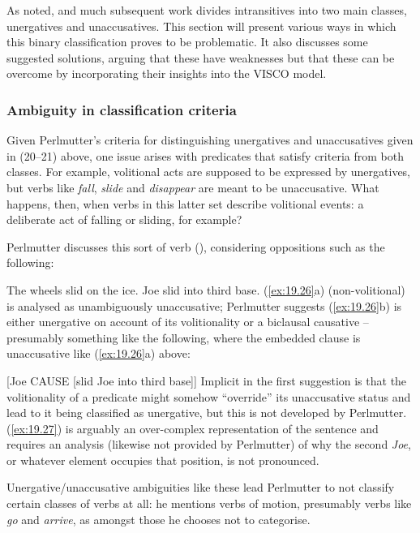 \documentclass[output=paper]{langsci/langscibook}
\begin{document}
As noted, \citet{Perlmutter1978} and much subsequent work divides intransitives
into two main classes, unergatives and unaccusatives. This section will present
various ways in which this binary classification proves to be problematic. It
also discusses some suggested solutions, arguing that these have weaknesses but
that these can be overcome by incorporating their insights into the VISCO
model.

\subsubsection{Ambiguity in classification criteria}

Given Perlmutter’s criteria for distinguishing unergatives and unaccusatives
given in (20–21) above, one issue arises with predicates that satisfy criteria
from both classes. For example, volitional acts are supposed to be expressed by
unergatives, but verbs like \emph{fall}, \emph{slide} and
\emph{disappear} are meant to be unaccusative. What happens, then, when verbs
in this latter set describe volitional events: a deliberate act of falling or
sliding, for example?

Perlmutter discusses this sort of verb (\citeyear[163--164]{Perlmutter1978}),
considering oppositions such as the following:

\ea\label{ex:19.26}
    \ea The wheels slid on the ice.
    \ex Joe slid into third base.\hfill\parencite[163--164]{Perlmutter1978}
    \z
\z
(\ref{ex:19.26}a) (non-volitional) is analysed as unambiguously unaccusative;
Perlmutter suggests (\ref{ex:19.26}b) is either unergative on
account of its volitionality or a biclausal causative – presumably something
like the following, where the embedded clause is
unaccusative like (\ref{ex:19.26}a) above:

\ea\label{ex:19.27}
    [Joe CAUSE [slid Joe into third base]]
\z
Implicit in the first suggestion is that the volitionality of a predicate might
somehow \enquote{override} its unaccusative status and lead
to it being classified as unergative, but this is not
developed by Perlmutter. (\ref{ex:19.27}) is arguably an over-complex
representation of the sentence and requires an analysis (likewise not provided
by Perlmutter) of why the second \emph{Joe}, or whatever element occupies that
position, is not pronounced.

Unergative/unaccusative ambiguities like these lead Perlmutter to not classify
certain classes of verbs at all: he mentions verbs of motion, presumably verbs
like \emph{go} and \emph{arrive}, as amongst those he chooses not to
categorise.
\end{document}
